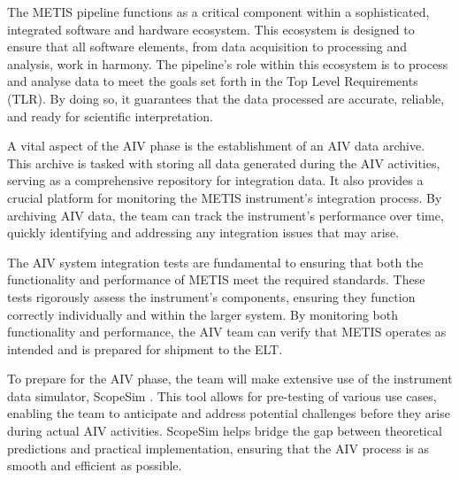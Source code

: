 \documentclass[a4paper]{spie}  %
\begin{document}


The METIS pipeline functions as a critical component within a sophisticated, integrated software and hardware ecosystem. This ecosystem is designed to ensure that all software elements, from data acquisition to processing and analysis, work in harmony. The pipeline's role within this ecosystem is to process and analyse data to meet the goals set forth in the Top Level Requirements (TLR). By doing so, it guarantees that the data processed are accurate, reliable, and ready for scientific interpretation.

A vital aspect of the AIV phase is the establishment of an AIV data archive. This archive is tasked with storing all data generated during the AIV activities, serving as a comprehensive repository for integration data. It also provides a crucial platform for monitoring the METIS instrument's integration process. By archiving AIV data, the team can track the instrument's performance over time, quickly identifying and addressing any integration issues that may arise.

The AIV system integration tests are fundamental to ensuring that both the functionality and performance of METIS meet the required standards. These tests rigorously assess the instrument's components, ensuring they function correctly individually and within the larger system. By monitoring both functionality and performance, the AIV team can verify that METIS operates as intended and is prepared for shipment to the ELT.

To prepare for the AIV phase, the team will make extensive use of the instrument data simulator, ScopeSim \cite{scopesim}. This tool allows for pre-testing of various use cases, enabling the team to anticipate and address potential challenges before they arise during actual AIV activities. ScopeSim helps bridge the gap between theoretical predictions and practical implementation, ensuring that the AIV process is as smooth and efficient as possible.
\end{document}

